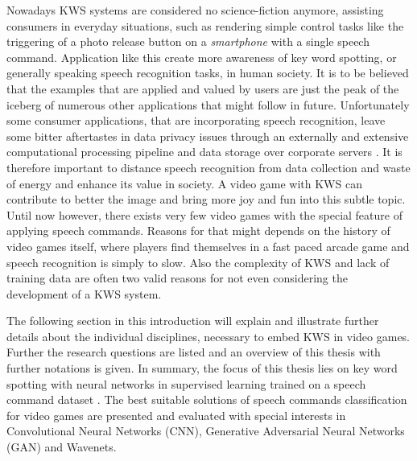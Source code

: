 Nowadays KWS systems are considered no science-fiction anymore, assisting consumers in everyday situations, such as rendering simple control tasks like the triggering of a photo release button on a \emph{smartphone} with a single speech command.
Application like this create more awareness of key word spotting, or generally speaking speech recognition tasks, in human society.
It is to be believed that the examples that are applied and valued by users are just the peak of the iceberg of numerous other applications that might follow in future.
Unfortunately some consumer applications, that are incorporating speech recognition, leave some bitter aftertastes in data privacy issues through an externally and extensive computational processing pipeline and data storage over corporate servers \cite{Tang2018}.
It is therefore important to distance speech recognition from data collection and waste of energy and enhance its value in society.
A video game with KWS can contribute to better the image and bring more joy and fun into this subtle topic.
Until now however, there exists very few video games with the special feature of applying speech commands.
Reasons for that might depends on the history of video games itself, where players find themselves in a fast paced arcade game and speech recognition is simply to slow.
Also the complexity of KWS and lack of training data are often two valid reasons for not even considering the development of a KWS system.

The following section in this introduction will explain and illustrate further details about the individual disciplines, necessary to embed KWS in video games. 
Further the research questions are listed and an overview of this thesis with further notations is given.
In summary, the focus of this thesis lies on key word spotting with neural networks in supervised learning trained on a speech command dataset \cite{Warden2018}.
The best suitable solutions of speech commands classification for video games are presented and evaluated with special interests in Convolutional Neural Networks (CNN), Generative Adversarial Neural Networks (GAN) and Wavenets.






%
%
%





